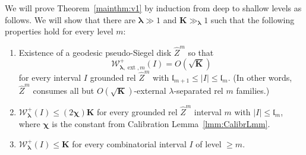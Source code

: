 \documentclass{amsart}
\newcommand{\1}{{\mathbb 1 }}
\newcommand{\blambda}{{\boldsymbol\lambda}}
\newcommand{\ext}{{\operatorname{ext}}}
\newcommand{\Width}{{\mathcal W}}
\newcommand{\wZ}{{\widehat Z}}
\newcommand{\bK}{{\mathbf K}}
\newcommand{\length}{{\mathfrak l}}
\theoremstyle{remark}
\numberwithin{equation}{section}
\theoremstyle{definition}
\newcommand{\bchi}{{\boldsymbol{ \chi}}}
\begin{document}
We will prove Theorem~\ref{mainthm:v1} by induction from deep to shallow levels as follows. We will show that there are $\blambda \gg 1$ and $\bK\gg_\blambda 1$ such that the following properties hold for every level $m$:
\begin{enumerate}[label=\text{(\alph*)},font=\normalfont,leftmargin=*]
\item Existence of a geodesic pseudo-Siegel disk $\wZ^m$ so that
\[\Width^+_{\blambda,\ext, m} (I) =O(\sqrt \bK)\]
for every interval $I$ grounded rel $\wZ^m$ with $\length_{m+1}\le |I|\le \length_m$. (In other words, $\wZ^m$ consumes all but $O(\sqrt{\bK})$-external $\lambda$-separated rel $m$ families.)
\label{eq:case1:main prf}
\item $\Width_\blambda^+(I)\le (2\bchi) \bK$ for every grounded rel $\wZ^m$ interval $m$ with $|I|\le \length_m$, where $\bchi$ is the constant from Calibration Lemma~\ref{lmm:CalibrLmm}.\label{eq:case2:main prf}
\item $\Width_\blambda^+(I)\le  \bK$ for every combinatorial interval $I$ of level $\ge m$.\label{eq:case3:main prf}
\end{enumerate}
\end{document}
